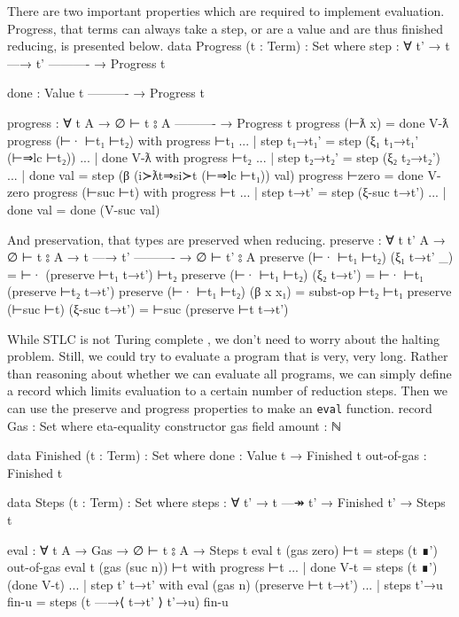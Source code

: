 \documentclass[logo,bsc,singlespacing,parskip,online]{infthesis}
\renewenvironment{code}{\mintedcopy[breaklines,breaksymbolleft=\;]{agda}}{\endmintedcopy}
\begin{document}
There are two important properties which are required to implement evaluation. Progress, that terms
can always take a step, or are a value and are thus finished reducing, is presented below.
\begin{code}
data Progress (t : Term) : Set where
  step : ∀ {t'}
    → t —→ t'
      ----------
    → Progress t

  done :
      Value t
      ----------
    → Progress t

progress : ∀ {t A}
  → ∅ ⊢ t ⦂ A
    ----------
  → Progress t
progress (⊢ƛ x) = done V-ƛ
progress (⊢· ⊢t₁ ⊢t₂) with progress ⊢t₁
... | step t₁→t₁' = step (ξ₁ t₁→t₁' (⊢⇒lc ⊢t₂))
... | done V-ƛ with progress ⊢t₂
...   | step t₂→t₂' = step (ξ₂ t₂→t₂')
...   | done val    = step (β (i≻ƛt⇒si≻t (⊢⇒lc ⊢t₁)) val)
progress ⊢zero = done V-zero
progress (⊢suc ⊢t) with progress ⊢t
... | step t→t' = step (ξ-suc t→t')
... | done val  = done (V-suc val)
\end{code}

And preservation, that types are preserved when reducing.
\begin{code}
preserve : ∀ {t t' A}
  → ∅ ⊢ t ⦂ A
  → t —→ t'
    ----------
  → ∅ ⊢ t' ⦂ A
preserve (⊢· ⊢t₁ ⊢t₂) (ξ₁ t→t' _) = ⊢· (preserve ⊢t₁ t→t') ⊢t₂
preserve (⊢· ⊢t₁ ⊢t₂) (ξ₂ t→t') = ⊢· ⊢t₁  (preserve ⊢t₂ t→t')
preserve (⊢· ⊢t₁ ⊢t₂) (β x x₁) = subst-op ⊢t₂ ⊢t₁
preserve (⊢suc ⊢t) (ξ-suc t→t') = ⊢suc (preserve ⊢t t→t')
\end{code}

While STLC is not Turing complete \cite{church_formulation_1940}, we don't need to worry about the
halting problem. Still, we could try to evaluate a program that is very, very long. Rather than
reasoning about whether we can evaluate all programs, we can simply define a record which limits
evaluation to a certain number of reduction steps. Then we can use the preserve and progress
properties to make an \texttt{eval} function.
\begin{code}
record Gas : Set where
  eta-equality
  constructor gas
  field
    amount : ℕ

data Finished (t : Term) : Set where
  done : Value t → Finished t
  out-of-gas : Finished t

data Steps (t : Term) : Set where
  steps : ∀ {t'} → t —↠ t' → Finished t' → Steps t

eval : ∀ {t A} → Gas → ∅ ⊢ t ⦂ A → Steps t
eval {t} (gas zero) ⊢t = steps (t ∎') out-of-gas
eval {t} (gas (suc n)) ⊢t with progress ⊢t
... | done V-t = steps (t ∎') (done V-t)
... | step {t'} t→t' with eval (gas n) (preserve ⊢t t→t')
...   | steps t'→u fin-u = steps (t —→⟨ t→t' ⟩ t'→u) fin-u
\end{code}
\end{document}
